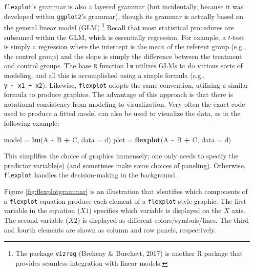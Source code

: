 \documentclass[
  man]{apa6}
\newenvironment{Shaded}{\begin{snugshade}}{\end{snugshade}}
\newcommand{\DataTypeTok}[1]{\textcolor[rgb]{0.13,0.29,0.53}{#1}}
\newcommand{\KeywordTok}[1]{\textcolor[rgb]{0.13,0.29,0.53}{\textbf{#1}}}
\newcommand{\NormalTok}[1]{#1}
\newcommand{\OperatorTok}[1]{\textcolor[rgb]{0.81,0.36,0.00}{\textbf{#1}}}
\newcommand{\StringTok}[1]{\textcolor[rgb]{0.31,0.60,0.02}{#1}}
\begin{document}
\texttt{flexplot}'s grammar is also a layered grammar (but incidentally, because it was developed within \texttt{ggplot2}'s grammar), though its grammar is actually based on the general linear model (GLM).\footnote{The package \texttt{vizreg} (Breheny \& Burchett, 2017) is another R package that provides seamless integration with linear models.} Recall that most statistical procedures are subsumed within the GLM, which is essentially regression. For example, a \(t\)-test is simply a regression where the intercept is the mean of the referent group (e.g., the control group) and the slope is simply the difference between the treatment and control groups. The base \texttt{R} function \texttt{lm} utilizes GLMs to do various sorts of modeling, and all this is accomplished using a simple formula (e.g., \texttt{y\ \textasciitilde{}\ x1\ +\ x2}). Likewise, \texttt{flexplot} adopts the same convention, utilizing a similar formula to produce graphics. The advantage of this approach is that there is notational consistency from modeling to visualization. Very often the exact code used to produce a fitted model can also be used to visualize the data, as in the following example:

\small

\begin{Shaded}
\begin{Highlighting}[]
\NormalTok{model =}\StringTok{       }\KeywordTok{lm}\NormalTok{(A }\OperatorTok{\textasciitilde{}}\StringTok{ }\NormalTok{B }\OperatorTok{+}\StringTok{ }\NormalTok{C, }\DataTypeTok{data =}\NormalTok{ d)}
\NormalTok{plot  =}\StringTok{ }\KeywordTok{flexplot}\NormalTok{(A }\OperatorTok{\textasciitilde{}}\StringTok{ }\NormalTok{B }\OperatorTok{+}\StringTok{ }\NormalTok{C, }\DataTypeTok{data =}\NormalTok{ d)}
\end{Highlighting}
\end{Shaded}

\normalsize

This simplifies the choice of graphics immensely; one only needs to specify the predictor variable(s) (and sometimes make some choices of paneling). Otherwise, \texttt{flexplot} handles the decision-making in the background.

Figure \ref{fig:flexplotgrammar} is an illustration that identifies which components of a \texttt{flexplot} equation produce each element of a \texttt{flexplot}-style graphic. The first variable in the equation (\(X1\)) specifies which variable is displayed on the \(X\) axis. The second variable (\(X2\)) is displayed as different colors/symbols/lines. The third and fourth elements are shown as column and row panels, respectively.
\end{document}
